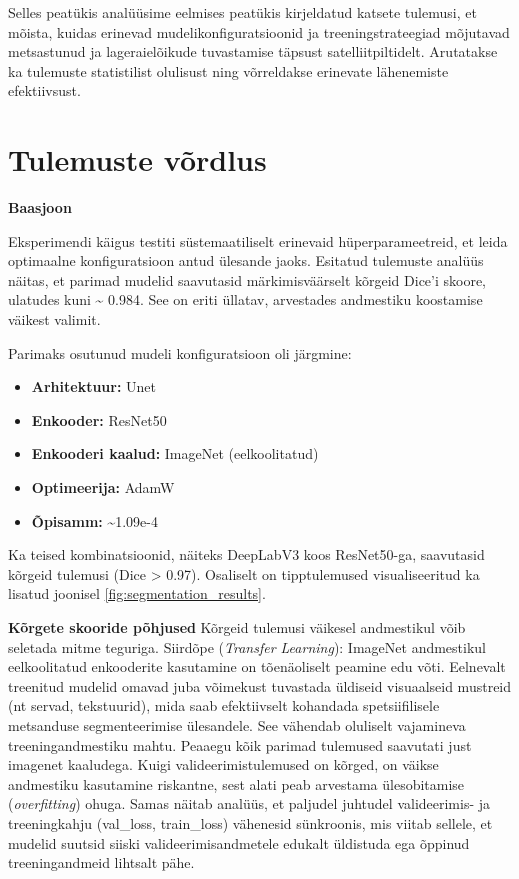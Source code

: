 Selles peatükis analüüsime eelmises peatükis kirjeldatud katsete tulemusi, et mõista, kuidas erinevad mudelikonfiguratsioonid ja treeningstrateegiad mõjutavad metsastunud ja lageraielõikude tuvastamise täpsust satelliitpiltidelt. Arutatakse ka tulemuste statistilist olulisust ning võrreldakse erinevate lähenemiste efektiivsust.
\section{Tulemuste võrdlus}
\textbf{Baasjoon}

Eksperimendi käigus testiti süstemaatiliselt erinevaid hüperparameetreid, et leida optimaalne konfiguratsioon antud ülesande jaoks. 
Esitatud tulemuste analüüs näitas, et parimad mudelid
saavutasid märkimisväärselt kõrgeid Dice'i skoore, ulatudes kuni \textasciitilde
0.984. See on eriti üllatav, arvestades andmestiku koostamise väikest valimit.

Parimaks osutunud mudeli konfiguratsioon oli järgmine:
\begin{itemize}
  \item \textbf{Arhitektuur:} Unet
  \item \textbf{Enkooder:} ResNet50
  \item \textbf{Enkooderi kaalud:} ImageNet (eelkoolitatud)
  \item \textbf{Optimeerija:} AdamW
  \item \textbf{Õpisamm:} \textasciitilde 1.09e-4
\end{itemize}

Ka teised kombinatsioonid,
näiteks DeepLabV3 koos ResNet50-ga, saavutasid kõrgeid tulemusi (Dice > 0.97).
Osaliselt on tipptulemused visualiseeritud ka lisatud joonisel \ref{fig:segmentation_results}.

\textbf{Kõrgete skooride põhjused}
Kõrgeid tulemusi väikesel andmestikul võib seletada mitme teguriga.
Siirdõpe (\textit{Transfer Learning}): ImageNet andmestikul eelkoolitatud enkooderite
kasutamine on tõenäoliselt peamine edu võti. Eelnevalt treenitud mudelid omavad
juba võimekust tuvastada üldiseid visuaalseid mustreid (nt servad, tekstuurid),
mida saab efektiivselt kohandada spetsiifilisele metsanduse segmenteerimise
ülesandele. See vähendab oluliselt vajamineva treeningandmestiku mahtu. Peaaegu
kõik parimad tulemused saavutati just imagenet kaaludega. 
Kuigi valideerimistulemused on kõrged, on väikse andmestiku kasutamine riskantne, sest alati peab arvestama ülesobitamise (\textit{overfitting}) ohuga. Samas näitab analüüs, et paljudel juhtudel valideerimis- ja treeningkahju
(val\_loss, train\_loss) vähenesid sünkroonis, mis viitab sellele, et mudelid
suutsid siiski valideerimisandmetele edukalt üldistuda ega õppinud
treeningandmeid lihtsalt pähe.

